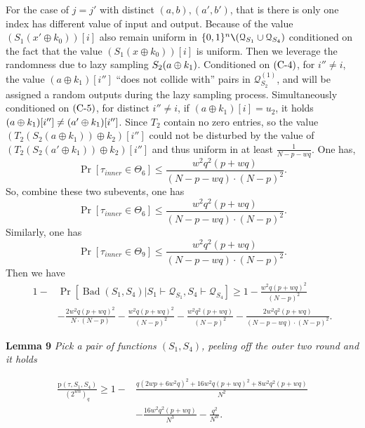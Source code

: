 For the case of $j=j'$ with distinct $(a,b),(a',b')$, that is there is only one index has different value of input and output. Because of the value $\left(S_{1}\left(x' \oplus k_{0}\right)\right)[i]$ also remain uniform in $\{0, 1\}^{n} \verb|\| (\mathcal{Q}_{S_{1}} \cup \mathcal{Q}_{S_{4}})$ conditioned on the fact that the value $\left(S_{1}\left(x \oplus k_{0}\right)\right)[i]$ is uniform. Then we leverage the randomness due to lazy sampling $S_2(a\oplus k_1)$. Conditioned on $\text{(C-4)}$, for $i''\neq i$, the value $(a \oplus k_1)[i'']$ ``does not collide with'' pairs in $\mathcal{Q}_{S_{2}}^{(1)}$, and will be assigned a random outputs during the lazy sampling process. Simultaneously conditioned on $\text{(C-5)}$, for distinct $i'' \neq i$, if $\left(a \oplus k_{1}\right)[i] = u_2$, it holds $(a\oplus k_1)[i'']\neq(a'\oplus k_1)[i'']$. Since $T_2$ contain no zero entries, so the value $\left(T_{2}\left(S_{2}\left(a \oplus k_{1}\right)\right) \oplus k_{2}\right)[i'']$ could not be disturbed by the value of $\left(T_{2}\left(S_{2}\left(a' \oplus k_{1}\right)\right) \oplus k_{2}\right)[i'']$ and thus uniform in at least
$\frac{1}{N - p- wq}$. One has,
$$
\operatorname{Pr}\left[\tau_{inner} \in \Theta_{6}\right] \leq \frac{w^{2} q^{2} (p+w q)}{(N- p- wq) \cdot (N-p)^2 }.
$$
\noindent So, combine these two subevents, one has
$$
\operatorname{Pr}\left[\tau_{inner} \in \Theta_{6}\right] \leq \frac{w^{2} q^{2} (p+w q)}{(N- p- wq) \cdot (N-p)^2 }.
$$
\noindent Similarly, one has
$$
\operatorname{Pr}\left[\tau_{inner} \in \Theta_{9}\right] \leq \frac{w^{2} q^{2} (p+w q)}{(N- p- wq) \cdot (N-p)^2 }.
$$
\noindent Then we have
$$
\begin{aligned}
1-&\operatorname{Pr}\left[\operatorname{Bad}\left(S_{1},S_{4}\right) | S_{1} \vdash \mathcal{Q}_{S_{1}},S_{4} \vdash \mathcal{Q}_{S_{4}}\right] \geq 1- \frac{w^{2} q (p+w q)^{2}}{(N-p)^{2}}\\
& -\frac{2 w^{2} q (p+w q)^{2}}{N \cdot (N-p)} - \frac{w^{2} q (p+w q)^{2}}{(N-p)^2} - \frac{w^{2} q^{2} (p+w q)}{(N-p)^2} - \frac{2 w^{2} q^{2} (p+w q)}{(N- p- wq) \cdot (N-p)^2}.
\end{aligned}
$$

\noindent \textbf{Lemma 9} \emph{Pick a pair of functions $(S_{1}, S_{4})$, peeling off the outer two round and it holds}

\begin{equation}
\begin{aligned}
\frac{\mathrm{p}\left(\tau, S_{1}, S_{4}\right)}{\left(2^{w n}\right)_{q}} \geq 1- &\frac{q(2wp+6w^{2}q)^2 + 16w^2q(p+ wq)^2 + 8w^2q^2(p+wq)}{N^2}\\
&- \frac{16w^2q^2(p+wq)}{N^3} - \frac{q^2}{N^w}.
\end{aligned}
\end{equation}

